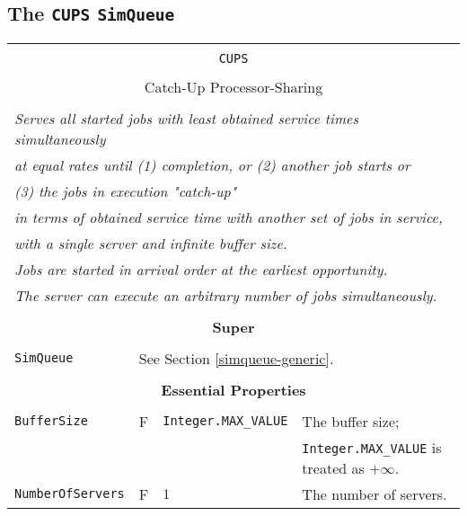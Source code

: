 \documentclass[12pt]{book}
\begin{document}
\subsection{The \lstinline{CUPS} \lstinline{SimQueue}}

\begin{tabular}{|l|l|l|l|}
\hline
\multicolumn{4}{|c|}{} \\
\multicolumn{4}{|c|}{\lstinline[basicstyle=\large]{CUPS}} \\
\multicolumn{4}{|c|}{} \\
\multicolumn{4}{|c|}{Catch-Up Processor-Sharing} \\
\multicolumn{4}{|c|}{} \\
\hline
\multicolumn{4}{|l|}{\em Serves all started jobs with least obtained service times simultaneously} \\
\multicolumn{4}{|l|}{\em at equal rates until (1) completion, or (2) another job starts or} \\
\multicolumn{4}{|l|}{\em (3) the jobs in execution "catch-up"} \\
\multicolumn{4}{|l|}{\em in terms of obtained service time with another set of jobs in service,} \\
\multicolumn{4}{|l|}{\em with a single server and infinite buffer size.} \\
\multicolumn{4}{|l|}{\em Jobs are started in arrival order at the earliest opportunity.} \\
\multicolumn{4}{|l|}{\em The server can execute an arbitrary number of jobs simultaneously.} \\
\hline
\multicolumn{4}{|c|}{} \\
\multicolumn{4}{|c|}{\bf Super} \\
\multicolumn{4}{|c|}{} \\
\hline
\lstinline|SimQueue| & \multicolumn{3}{|l|}{See Section \ref{simqueue-generic}.} \\
\hline
\multicolumn{4}{|c|}{} \\
\multicolumn{4}{|c|}{\bf Essential Properties} \\
\multicolumn{4}{|c|}{} \\
\hline
\lstinline|BufferSize|      & F & \lstinline|Integer.MAX_VALUE|
                            & The buffer size; \\
                        & & & \lstinline|Integer.MAX_VALUE| is treated as $+\infty$. \\
\hline
\lstinline|NumberOfServers|    & F & $1$
                               & The number of servers. \\

\end{tabular}
\end{document}
